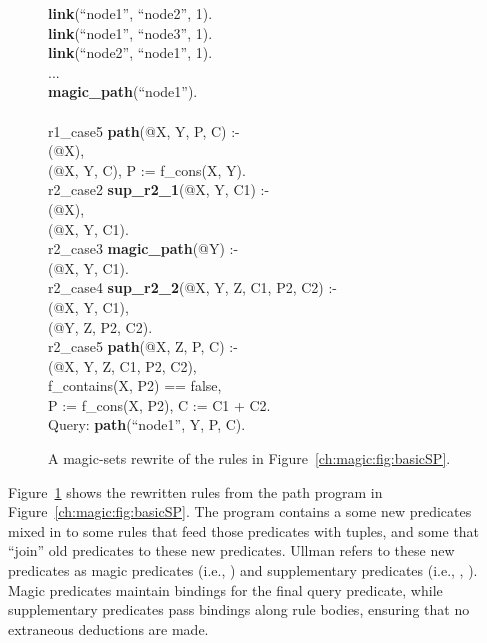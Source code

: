 \begin{figure}[!t]
\ssp
\begin{boxedminipage}{\linewidth}
{\bf link}(``node1'', ``node2'', 1).\\
{\bf link}(``node1'', ``node3'', 1).\\
{\bf link}(``node2'', ``node1'', 1).\\
...\\
{\bf magic\_path}(``node1''). \\
\\
r1\_case5 {\bf path}(@X, Y, P, C) :- \\
(@X), \\
(@X, Y, C), P := f\_cons(X, Y).\\

r2\_case2 {\bf sup\_r2\_1}(@X, Y, C1) :- \\
(@X), \\
(@X, Y, C1). \\

r2\_case3 {\bf magic\_path}(@Y) :- \\
(@X, Y, C1). \\

r2\_case4 {\bf sup\_r2\_2}(@X, Y, Z, C1, P2, C2) :- \\
(@X, Y, C1), \\
(@Y, Z, P2, C2). \\

r2\_case5 {\bf path}(@X, Z, P, C) :- \\
(@X, Y, Z, C1, P2, C2), \\
\datalogspace f\_contains(X, P2) == false, \\
\datalogspace P := f\_cons(X, P2), C := C1 + C2. \\

Query: {\bf path}(``node1'', Y, P, C).
\end{boxedminipage}
\caption{\label{ch:magic:fig:magicSP}A magic-sets rewrite of 
the rules in Figure~\ref{ch:magic:fig:basicSP}.}
\end{figure}

Figure~\ref{ch:magic:fig:magicSP} shows the rewritten rules from the path
program in Figure~\ref{ch:magic:fig:basicSP}.  The program contains a some new
predicates mixed in to some rules that feed those predicates with tuples, and
some that ``join'' old predicates to these new predicates.  Ullman refers to
these new predicates as magic predicates (i.e., ) and
supplementary predicates (i.e., , ).  Magic predicates
maintain bindings for the final query predicate, while supplementary predicates
pass bindings along rule bodies, ensuring that no extraneous deductions are made.


